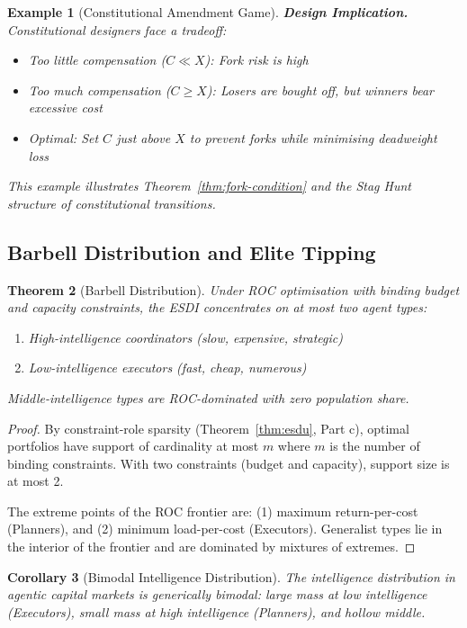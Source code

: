\documentclass[12pt]{article}
\newtheorem{theorem}{Theorem}[section]
\newtheorem{corollary}[theorem]{Corollary}
\newtheorem{example}[theorem]{Example}
\begin{document}
\begin{example}[Constitutional Amendment Game]
\textbf{Design Implication.}
Constitutional designers face a tradeoff:
\begin{itemize}
    \item Too little compensation ($C \ll X$): Fork risk is high
    \item Too much compensation ($C \geq X$): Losers are bought off, but winners bear excessive cost
    \item Optimal: Set $C$ just above $X$ to prevent forks while minimising deadweight loss
\end{itemize}

This example illustrates Theorem~\ref{thm:fork-condition} and the Stag Hunt structure of constitutional transitions.
\end{example}

\subsection{Barbell Distribution and Elite Tipping}

\begin{theorem}[Barbell Distribution]
\label{thm:barbell-distribution}
Under ROC optimisation with binding budget and capacity constraints, the ESDI concentrates on at most two agent types:
\begin{enumerate}
    \item High-intelligence coordinators (slow, expensive, strategic)
    \item Low-intelligence executors (fast, cheap, numerous)
\end{enumerate}
Middle-intelligence types are ROC-dominated with zero population share.
\end{theorem}

\begin{proof}
By constraint-role sparsity (Theorem~\ref{thm:esdu}, Part c), optimal portfolios have support of cardinality at most $m$ where $m$ is the number of binding constraints. With two constraints (budget and capacity), support size is at most 2.

The extreme points of the ROC frontier are: (1) maximum return-per-cost (Planners), and (2) minimum load-per-cost (Executors). Generalist types lie in the interior of the frontier and are dominated by mixtures of extremes.
\end{proof}

\begin{corollary}[Bimodal Intelligence Distribution]
The intelligence distribution in agentic capital markets is generically bimodal: large mass at low intelligence (Executors), small mass at high intelligence (Planners), and hollow middle.
\end{corollary}
\end{document}
